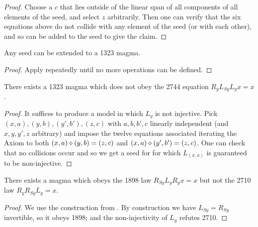\begin{proof}  Choose a $c$ that lies outside of the linear span of all components of all elements of the seed, and select $z$ arbitrarily.  Then one can verify that the six equations above do not collide with any element of the seed (or with each other), and so can be added to the seed to give the claim.
\end{proof}


\begin{corollary}\label{create-1323} Any seed can be extended to a 1323 magma.
\end{corollary}

\begin{proof}  Apply  repeatedly until no more operations can be defined.
\end{proof}

\begin{corollary}\label{1323-refute-2744}  There exists a 1323 magma which does not obey the 2744 equation $R_y L_{Sy} L_y x = x$.
\end{corollary}

\begin{proof} It suffices to produce a model in which $L_y$ is not injective. Pick $(x,a), (y,b), (y',b'), (z,c)$ with $a,b,b',c$ linearly independent (and $x,y,y',z$ arbitrary) and impose the twelve equations associated iterating the Axiom to both $(x,a) \diamond (y,b) = (z,c)$ and $(x,a) \diamond (y',b') = (z,c)$.  One can check that no collisions occur and so we get a seed for  for which $L_{(x,a)}$ is guaranteed to be non-injective.
\end{proof}

\begin{corollary}\label{1898-refute-1729}  There exists a magma which obeys the 1898 law $R_{Sy} L_y R_y x = x$ but not the 2710 law $R_y R_{Sy} L_y = x$.
\end{corollary}

\begin{proof}  We use the construction from .  By construction we have $L_{Sy} = R_{Sy}$ invertible, so it obeys 1898; and the non-injectivity of $L_y$ refutes 2710.
\end{proof}
